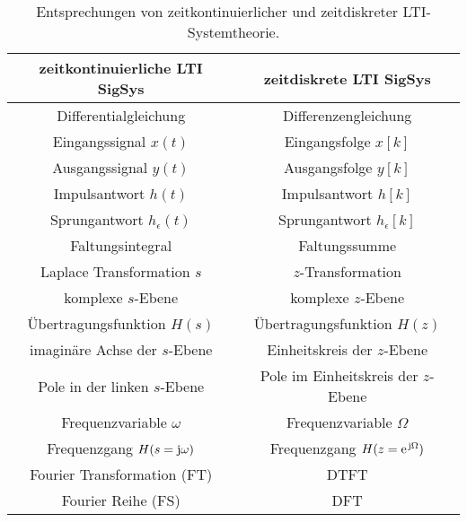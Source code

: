 \begin{table}[h]
\begin{center}
\begin{tabular}{ | c | c | }
\hline
zeitkontinuierliche LTI SigSys & zeitdiskrete LTI SigSys\\\hline
Differentialgleichung & Differenzengleichung \\
Eingangssignal $x(t)$ & Eingangsfolge $x[k]$ \\
Ausgangssignal $y(t)$ & Ausgangsfolge $y[k]$ \\
Impulsantwort $h(t)$ & Impulsantwort $h[k]$ \\
Sprungantwort $h_\epsilon(t)$ & Sprungantwort $h_\epsilon[k]$ \\
Faltungsintegral & Faltungssumme \\
Laplace Transformation $s$ & $z$-Transformation \\
komplexe $s$-Ebene & komplexe $z$-Ebene\\
Übertragungsfunktion $H(s)$ & Übertragungsfunktion $H(z)$ \\
imaginäre Achse der $s$-Ebene & Einheitskreis der $z$-Ebene\\
Pole in der linken $s$-Ebene &
Pole im Einheitskreis der $z$-Ebene \\
Frequenzvariable $\omega$ & Frequenzvariable $\Omega$ \\
Frequenzgang $H(s=\im\omega)$ & Frequenzgang $H(z=\e^{\im\Omega})$ \\
Fourier Transformation (FT)  & DTFT\\
Fourier Reihe (FS)  & DFT \\\hline
\end{tabular}
\end{center}
\caption{Entsprechungen von zeitkontinuierlicher und zeitdiskreter LTI-Systemtheorie.}
\label{tbl:Analogien_CT_DT}
\end{table}








